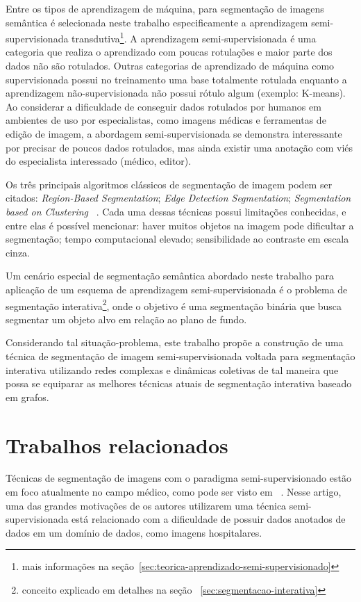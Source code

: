 Entre os tipos de aprendizagem de máquina, para segmentação de imagens
semântica é selecionada neste trabalho especificamente a aprendizagem
semi-supervisionada transdutiva\footnote{mais informações na
seção~\ref{sec:teorica-aprendizado-semi-supervisionado}}. A
aprendizagem semi-supervisionada é uma categoria que realiza o
aprendizado com poucas rotulações e maior parte dos dados não são
rotulados. Outras categorias de aprendizado de máquina como
supervisionada possui no treinamento uma base totalmente rotulada
enquanto a aprendizagem não-supervisionada não possui rótulo algum
(exemplo: K-means). Ao considerar a dificuldade de conseguir dados
rotulados por humanos em ambientes de uso por especialistas, como imagens
médicas e ferramentas de edição de imagem, a abordagem
semi-supervisionada se demonstra interessante por precisar de poucos
dados rotulados, mas ainda existir uma anotação com viés do
especialista interessado (médico, editor).


Os três principais algoritmos clássicos de segmentação de imagem podem
ser citados: \textit{Region-Based Segmentation}; \textit{Edge Detection
  Segmentation}; \textit{Segmentation based on Clustering}
~\cite{ImageSegmentationTechniques1985}. Cada uma dessas técnicas
possui limitações conhecidas, e entre elas é possível mencionar: haver
muitos objetos na imagem pode dificultar a segmentação; tempo
computacional elevado; sensibilidade ao contraste em escala cinza.

Um cenário especial de segmentação semântica abordado neste trabalho
para aplicação de um esquema de aprendizagem semi-supervisionada é o
problema de segmentação interativa\footnote{conceito explicado em
detalhes na seção ~\ref{sec:segmentacao-interativa}}, onde o objetivo
é uma segmentação binária que busca segmentar um objeto alvo em
relação ao plano de fundo.

Considerando tal situação-problema, este trabalho propõe a construção
de uma técnica de segmentação de imagem semi-supervisionada voltada
para segmentação interativa utilizando redes complexas e dinâmicas
coletivas de tal maneira que possa se equiparar as melhores técnicas
atuais de segmentação interativa baseado em grafos.

\section{Trabalhos relacionados}\label{cap:trabalhos-relacionados}

Técnicas de segmentação de imagens com o paradigma semi-supervisionado
estão em foco atualmente no campo médico, como pode ser visto em
~\cite{LuoSemiSupervised2021}. Nesse artigo, uma das grandes
motivações de os autores utilizarem uma técnica semi-supervisionada
está relacionado com a dificuldade de possuir dados anotados de dados
em um domínio de dados, como imagens hospitalares.

